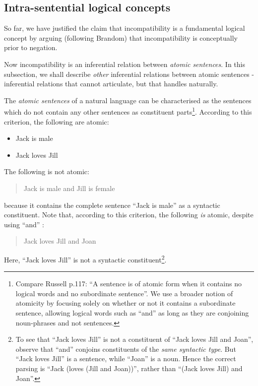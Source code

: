 \subsection{Intra-sentential logical concepts}
\label{intrasentential}
So far, we have justified the claim that incompatibility is a fundamental logical concept by arguing (following Brandom) that incompatibility is conceptually prior to negation. 

Now incompatibility is an inferential relation between \emph{atomic sentences}. 
In this subsection, we shall describe \emph{other} inferential relations between atomic sentences - inferential relations that \fol{} cannot articulate, but that \cathoristic{} handles naturally.

The \emph{atomic sentences} of a natural language can be
characterised as the sentences which do not contain any other
sentences as constituent parts\footnote{Compare Russell \cite{russell}
  p.117: ``A sentence is of atomic form when it contains no logical
  words and no subordinate sentence''. We use a broader notion of
  atomicity by focusing solely on whether or not it contains a
  subordinate sentence, allowing logical words such as ``and'' as long
  as they are conjoining noun-phrases and not sentences.}.  According
to this criterion, the following are atomic:

\begin{itemize}

\item Jack is male
\item Jack loves Jill
\end{itemize}

\NI The following is not atomic:

\begin{quote}
  Jack is male and Jill is female
\end{quote}

\NI because it contains the complete sentence ``Jack is male'' as a
syntactic constituent.  Note that, according to this criterion, the
following \emph{is} atomic, despite using ``and'' :

\begin{quote}
  Jack loves Jill and Joan
\end{quote}

\NI Here, ``Jack loves Jill'' is not a syntactic constituent\footnote{To see that ``Jack loves Jill'' is not a constituent of ``Jack loves Jill and Joan'', observe that ``and'' conjoins constituents of the \emph{same syntactic type}. But ``Jack loves Jill'' is a sentence, while ``Joan'' is a noun. Hence the correct parsing is ``Jack (loves (Jill and Joan))'', rather than ``(Jack loves Jill) and Joan''.}.

